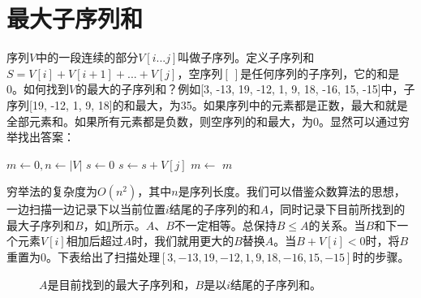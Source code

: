 \documentclass[b5paper]{ctexart}
\begin{document}
\section{最大子序列和}

序列$V$中的一段连续的部分$V[i...j]$叫做子序列。定义子序列和$S = V[i] + V[i+1] + ... + V[j]$，空序列$[\ ]$是任何序列的子序列，它的和是0。如何找到$V$的最大的子序列和\cite{Bentley}？例如[3, -13, 19, -12, 1, 9, 18, -16, 15, -15]中，子序列[19, -12, 1, 9, 18]的和最大，为35。如果序列中的元素都是正数，最大和就是全部元素和。如果所有元素都是负数，则空序列的和最大，为0。显然可以通过穷举找出答案：

\begin{algorithmic}[1]
  \State $m \gets 0, n \gets |V|$
    \State $s \gets 0$
      \State $s \gets s + V[j]$
      \State $m \gets $ 
    \EndFor
  \EndFor
  \State \Return $m$
\EndFunction
\end{algorithmic}

穷举法的复杂度为$O(n^2)$，其中$n$是序列长度。我们可以借鉴众数算法的思想，一边扫描一边记录下以当前位置$i$结尾的子序列的和$A$，同时记录下目前所找到的最大子序列和$B$，如\cref{fig:max-sum-invariant}所示。$A$、$B$不一定相等。总保持$B \leq A$的关系。当$B$和下一个元素$V[i]$相加后超过$A$时，我们就用更大的$B$替换$A$。当$B + V[i] < 0$时，将$B$重置为0。下表给出了扫描处理$[3, -13, 19, -12, 1, 9, 18, -16, 15, -15]$时的步骤。

\begin{figure}[htbp]
 \centering
 \caption{$A$是目前找到的最大子序列和，$B$是以$i$结尾的子序列和。}
 \label{fig:max-sum-invariant}
\end{figure}
\end{document}

